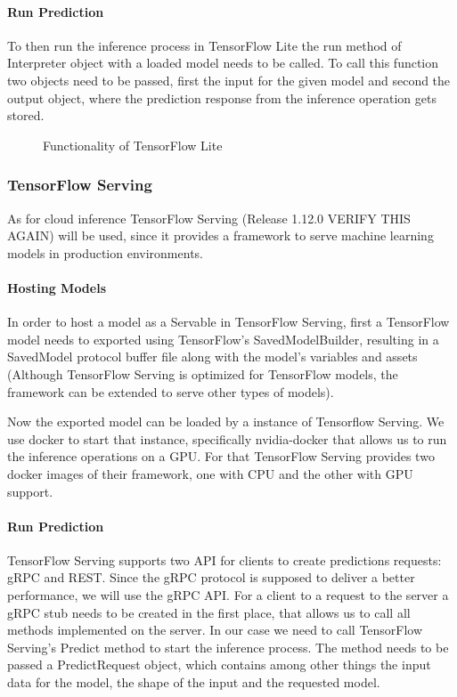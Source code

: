 \paragraph{Run Prediction}

To then run the inference process in TensorFlow Lite the run method of Interpreter object with a loaded model needs to be called. To call this function two objects need to be passed, first the input for the given model and second the output object, where the prediction response from the inference operation gets stored. 
\begin{figure}[H]
\centering

\caption{Functionality of TensorFlow Lite}
\label{fig:edge}
\end{figure}
\subsubsection{TensorFlow Serving}
\label{chap:TFServing}
As for cloud inference TensorFlow Serving (Release 1.12.0 VERIFY THIS AGAIN) will be used, since it provides a framework to serve machine learning models in production environments. 



\paragraph{Hosting Models}
In order to host a model as a Servable in TensorFlow Serving, first a TensorFlow model needs to exported using TensorFlow's SavedModelBuilder, resulting in a SavedModel protocol buffer file along with the model’s variables and assets (Although TensorFlow Serving is optimized for TensorFlow models, the framework can be extended to serve other types of models).

Now the exported model can be loaded by a instance of Tensorflow Serving.
We use docker to start that instance, specifically nvidia-docker that allows us to run the inference operations on a GPU. For that TensorFlow Serving provides two docker images of their framework, one with CPU and the other with GPU support.

\paragraph{Run Prediction}
TensorFlow Serving supports two API for clients to create predictions requests: gRPC and REST. Since the gRPC protocol is supposed to deliver a better performance, we will use the gRPC API.
For a client to a request to the server a gRPC stub needs to be created in the first place, that allows us to call all methods implemented on the server. In our case we need to call TensorFlow Serving's Predict method to start the inference process. The method needs to be passed a PredictRequest object, which contains among other things the input data for the model, the shape of the input and the requested model.%

